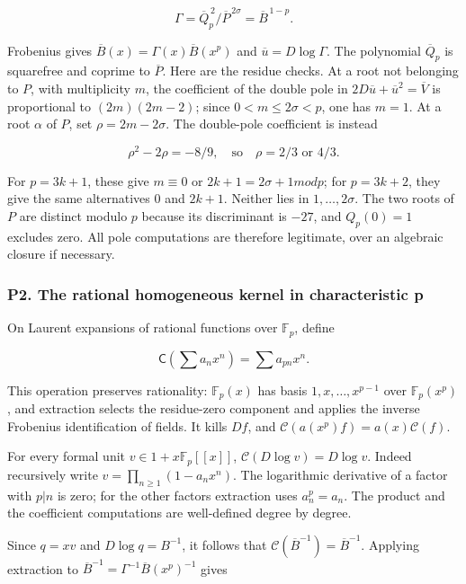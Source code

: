 \documentclass[11pt,a4paper]{article}
\begin{document}
\[
\Gamma=\overline Q_p^{\,2}/\overline P^{\,2\sigma}
=\overline B^{\,1-p}.
\]

Frobenius gives \(\overline{B}(x)=Γ(x)\overline{B}(x^p)\) and \(\overline{u}=D \operatorname{log} Γ\). The polynomial \(\overline{Q}_p\) is squarefree and coprime to \(\overline{P}\). Here are the residue checks. At a root not belonging to \(P\), with multiplicity \(m\), the coefficient of the double pole in \(2D\overline{u}+\overline{u}^{2}=\overline{V}\) is proportional to \((2m)(2m-2)\); since \(0<m≤2σ<p\), one has \(m=1\). At a root \(α\) of \(P\), set \(ρ=2m-2σ\). The double-pole coefficient is instead

\[
\rho^2-2\rho=-8/9,
\quad\text{so}\quad\rho=2/3\text{ or }4/3.
\]

For \(p=3k+1\), these give \(m≡0\) or \(2k+1=2σ+1 mod p\); for \(p=3k+2\), they give the same alternatives \(0\) and \(2k+1\). Neither lies in \(1,\ldots ,2σ\). The two roots of \(P\) are distinct modulo \(p\) because its discriminant is \(-27\), and \(Q_p(0)=1\) excludes zero. All pole computations are therefore legitimate, over an algebraic closure if necessary.

\hypertarget{p2.-the-rational-homogeneous-kernel-in-characteristic-p}{%
\subsubsection{P2. The rational homogeneous kernel in characteristic p}\label{p2.-the-rational-homogeneous-kernel-in-characteristic-p}}

On Laurent expansions of rational functions over \(\mathbb{F}_p\), define

\[
\mathsf C\left(\sum a_nx^n\right)=\sum a_{pn}x^n.
\]

This operation preserves rationality: \(\mathbb{F}_p(x)\) has basis \(1,x,\ldots ,x^{p-1}\) over \(\mathbb{F}_p(x^p)\), and extraction selects the residue-zero component and applies the inverse Frobenius identification of fields. It kills \(Df\), and \(\mathcal{C}(a(x^p)f)=a(x)\mathcal{C}(f)\).

For every formal unit \(v∈1+x\mathbb{F}_p[[x]]\), \(\mathcal{C}(D \operatorname{log} v)=D \operatorname{log} v\). Indeed recursively write \(v=\prod _{n≥1}(1-a_nx^n)\). The logarithmic derivative of a factor with \(p|n\) is zero; for the other factors extraction uses \(a_n^p=a_n\). The product and the coefficient computations are well-defined degree by degree.

Since \(q=xv\) and \(D \operatorname{log} q=B^{-1}\), it follows that \(\mathcal{C}(\overline{B}^{-1})=\overline{B}^{-1}\). Applying extraction to \(\overline{B}^{-1}=Γ^{-1}\overline{B}(x^p)^{-1}\) gives
\end{document}
